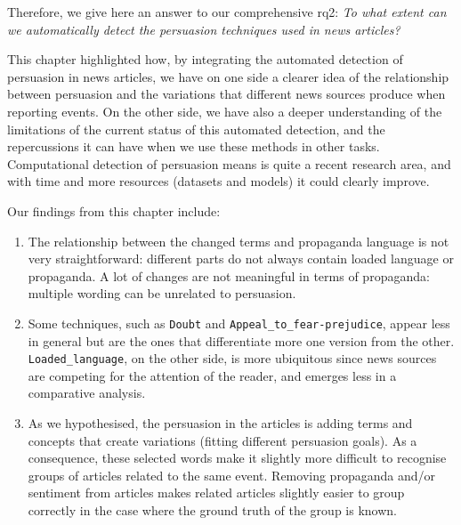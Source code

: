 

Therefore, we give here an answer to our comprehensive \acrshort{rq}2: \emph{To what extent can we automatically detect the persuasion techniques used in news articles?}

This chapter highlighted how, by integrating the automated detection of persuasion in news articles, we have on one side a clearer idea of the relationship between persuasion and the variations that different news sources produce when reporting events.
On the other side, we have also a deeper understanding of the limitations of the current status of this automated detection, and the repercussions it can have when we use these methods in other tasks.
Computational detection of persuasion means is quite a recent research area, and with time and more resources (datasets and models) it could clearly improve.%

Our findings from this chapter include:
\begin{enumerate}
    \item The relationship between the changed terms and propaganda language is not very straightforward: different parts do not always contain loaded language or propaganda. A lot of changes are not meaningful in terms of propaganda: multiple wording can be unrelated to persuasion. %
    \item Some techniques, such as \texttt{Doubt} and \texttt{Appeal\_to\_fear-prejudice}, appear less in general but are the ones that differentiate more one version from the other. \texttt{Loaded\_language}, on the other side, is more ubiquitous since news sources are competing for the attention of the reader, and emerges less in a comparative analysis.
    \item As we hypothesised, the persuasion in the articles is adding terms and concepts that create variations (fitting different persuasion goals). As a consequence, these selected words make it slightly more difficult to recognise groups of articles related to the same event.
    Removing propaganda and/or sentiment from articles makes related articles slightly easier to group correctly in the case where the ground truth of the group is known.%
\end{enumerate}

